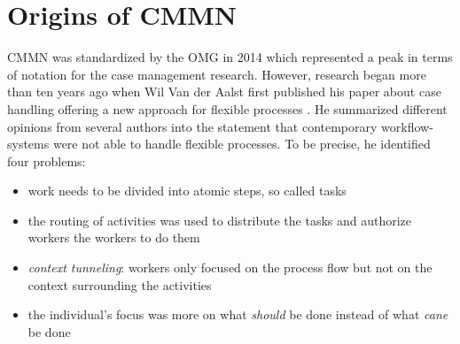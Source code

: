 \section{Origins of CMMN}
\ac{CMMN} was standardized by the \ac{OMG} in 2014 which represented a peak in terms of notation for the case management research. However, research began more than ten years ago when Wil Van der Aalst first published his paper about case handling offering a new approach for flexible processes \cite{aalst2003}. He summarized different opinions from several authors into the statement that contemporary workflow-systems were not able to handle flexible processes. To be precise, he identified four problems: 
\begin{itemize}
\item work needs to be divided into atomic steps, so called tasks
\item the routing of activities was used to distribute the tasks and authorize workers the workers to do them 
\item \textit{context tunneling}: workers only focused on the process flow but not on the context surrounding the activities
\item the individual's focus was more on what \textit{should} be done instead of what \textit{cane} be done 
\end{itemize} 

